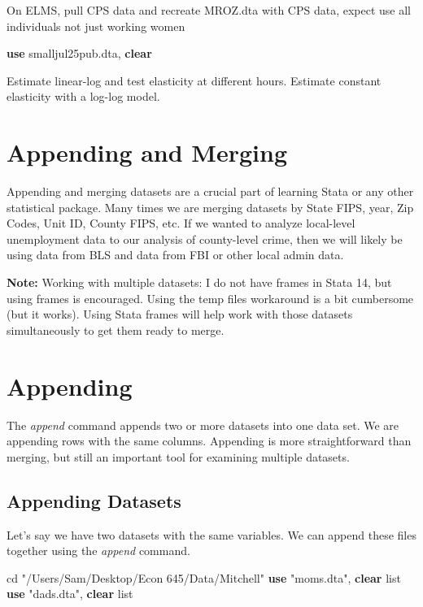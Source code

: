 \documentclass[
]{book}
\newenvironment{Shaded}{\begin{snugshade}}{\end{snugshade}}
\newcommand{\KeywordTok}[1]{\textcolor[rgb]{0.13,0.29,0.53}{\textbf{#1}}}
\newcommand{\NormalTok}[1]{#1}
\newcommand{\OtherTok}[1]{\textcolor[rgb]{0.56,0.35,0.01}{#1}}
\newcommand{\StringTok}[1]{\textcolor[rgb]{0.31,0.60,0.02}{#1}}
\begin{document}
On ELMS, pull CPS data and recreate MROZ.dta with CPS data, expect use all individuals not just working women

\begin{Shaded}
\begin{Highlighting}[]
\KeywordTok{use}\NormalTok{ smalljul25pub.dta, }\KeywordTok{clear}
\end{Highlighting}
\end{Shaded}

Estimate linear-log and test elasticity at different hours. Estimate constant elasticity with a log-log model.

\chapter{Appending and Merging}\label{appending-and-merging}

Appending and merging datasets are a crucial part of learning Stata or any other statistical package. Many times we are merging datasets by State FIPS, year, Zip Codes, Unit ID, County FIPS, etc. If we wanted to analyze local-level unemployment data to our analysis of county-level crime, then we will likely be using data from BLS and data from FBI or other local admin data.

\textbf{Note:} Working with multiple datasets:
I do not have frames in Stata 14, but using frames is encouraged. Using the temp files workaround is a bit cumbersome (but it works). Using Stata frames will help work with those datasets simultaneously to get them ready to merge.

\chapter{Appending}\label{appending}

The \emph{append} command appends two or more datasets into one data set. We are appending rows with the same columns. Appending is more straightforward than merging, but still an important tool for examining multiple datasets.

\section{Appending Datasets}\label{appending-datasets}

Let's say we have two datasets with the same variables. We can append these files together using the \emph{append} command.

\begin{Shaded}
\begin{Highlighting}[]
\NormalTok{cd }\StringTok{"/Users/Sam/Desktop/Econ 645/Data/Mitchell"}
\KeywordTok{use} \StringTok{"moms.dta"}\NormalTok{, }\KeywordTok{clear}
\OtherTok{list}
\KeywordTok{use} \StringTok{"dads.dta"}\NormalTok{, }\KeywordTok{clear}
\OtherTok{list}
\end{Highlighting}
\end{Shaded}
\end{document}
